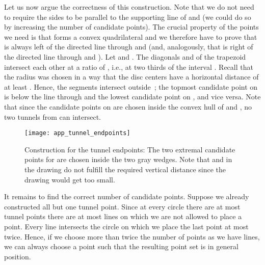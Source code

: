 \documentclass[11pt,a4paper]{article}
\begin{document}
Let us now argue the correctness of this construction.
Note that we do not need to require the sides to be parallel to the supporting line of  and  (we could do so by increasing the number of candidate points).
The crucial property of the points we need is that  forms a convex quadrilateral and we therefore have to prove that  is always left of the directed line through  and  (and, analogously, that  is right of the directed line through  and ).
Let  and .
The diagonals  and  of the trapezoid  intersect each other at a ratio of , i.e., at two thirds of the interval .
Recall that the radius  was chosen in a way that the disc centers have a horizontal distance of at least .
Hence, the segments intersect outside~;
the topmost candidate point on  is below the line through  and the lowest candidate point on , and vice versa.
Note that since the candidate points on  are chosen inside the convex hull of  and , no two tunnels from  can intersect.


\begin{figure}
\centering
\texttt{[image: app\_tunnel\_endpoints]}
\caption{Construction for the tunnel endpoints: The two extremal candidate points for  are chosen inside the two gray wedges.
Note that  and  in the drawing do not fulfill the required vertical distance since the drawing would get too small.
}
\label{fig_app_tunnel_endpoints}
\end{figure}


It remains to find the correct number of candidate points.
Suppose we already constructed all but one tunnel point.
Since at every circle there are at most  tunnel points there are at most  lines on which we are not allowed to place a point.
Every line intersects the circle on which we place the last point at most twice.
Hence, if we choose more than twice the number of points as we have lines, we can always choose a point such that the resulting point set is in general position.
\end{document}
